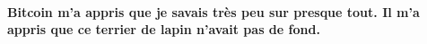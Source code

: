 \paragraph{Bitcoin m'a appris que je savais très peu sur presque tout. Il m'a
appris que ce terrier de lapin n'avait pas de fond.}

%
%
%
%
%
